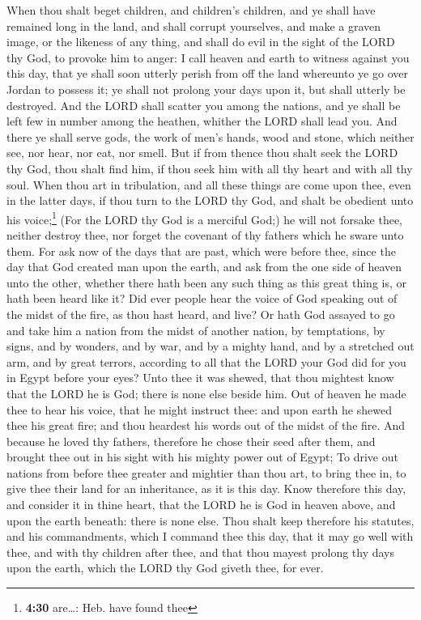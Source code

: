  When thou shalt beget children, and children's children,
and ye shall have remained long in the land, and shall corrupt
yourselves, and make a graven image, or the likeness of any thing, and
shall do evil in the sight of the LORD thy God, to provoke him to anger:
 I call heaven and earth to witness against you this day,
that ye shall soon utterly perish from off the land whereunto ye go over
Jordan to possess it; ye shall not prolong your days upon it, but shall
utterly be destroyed.  And the LORD shall scatter you
among the nations, and ye shall be left few in number among the heathen,
whither the LORD shall lead you.  And there ye shall
serve gods, the work of men's hands, wood and stone, which neither see,
nor hear, nor eat, nor smell.  But if from thence thou
shalt seek the LORD thy God, thou shalt find him, if thou seek him with
all thy heart and with all thy soul.  When thou art in
tribulation, and all these things are come upon thee, even in the latter
days, if thou turn to the LORD thy God, and shalt be obedient unto his
voice;\footnote{\textbf{4:30} are\ldots: Heb. have found thee}
 (For the LORD thy God is a merciful God;) he will not
forsake thee, neither destroy thee, nor forget the covenant of thy
fathers which he sware unto them.  For ask now of the
days that are past, which were before thee, since the day that God
created man upon the earth, and ask from the one side of heaven unto the
other, whether there hath been any such thing as this great thing is, or
hath been heard like it?  Did ever people hear the voice
of God speaking out of the midst of the fire, as thou hast heard, and
live?  Or hath God assayed to go and take him a nation
from the midst of another nation, by temptations, by signs, and by
wonders, and by war, and by a mighty hand, and by a stretched out arm,
and by great terrors, according to all that the LORD your God did for
you in Egypt before your eyes?  Unto thee it was shewed,
that thou mightest know that the LORD he is God; there is none else
beside him.  Out of heaven he made thee to hear his
voice, that he might instruct thee: and upon earth he shewed thee his
great fire; and thou heardest his words out of the midst of the fire.
 And because he loved thy fathers, therefore he chose
their seed after them, and brought thee out in his sight with his mighty
power out of Egypt;  To drive out nations from before
thee greater and mightier than thou art, to bring thee in, to give thee
their land for an inheritance, as it is this day.  Know
therefore this day, and consider it in thine heart, that the LORD he is
God in heaven above, and upon the earth beneath: there is none else.
 Thou shalt keep therefore his statutes, and his
commandments, which I command thee this day, that it may go well with
thee, and with thy children after thee, and that thou mayest prolong thy
days upon the earth, which the LORD thy God giveth thee, for ever.

